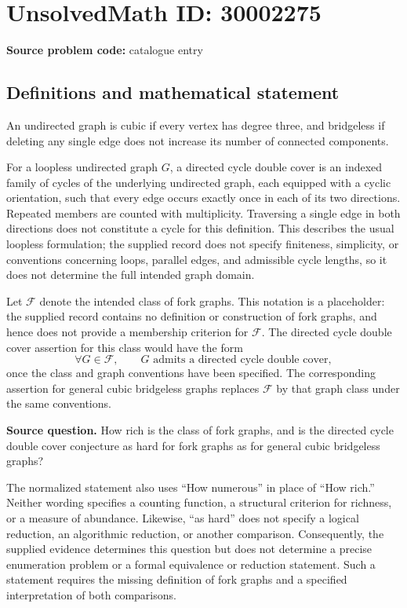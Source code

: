 \documentclass[11pt]{article}
\begin{document}
\section*{UnsolvedMath ID: 30002275}
\textbf{Source problem code:} catalogue entry
\subsection{Definitions and mathematical statement}
An undirected graph is cubic if every vertex has degree three, and bridgeless if deleting any single edge does not increase its number of connected components.

For a loopless undirected graph \(G\), a directed cycle double cover is an indexed family of cycles of the underlying undirected graph, each equipped with a cyclic orientation, such that every edge occurs exactly once in each of its two directions. Repeated members are counted with multiplicity. Traversing a single edge in both directions does not constitute a cycle for this definition. This describes the usual loopless formulation; the supplied record does not specify finiteness, simplicity, or conventions concerning loops, parallel edges, and admissible cycle lengths, so it does not determine the full intended graph domain.

Let \(\mathcal F\) denote the intended class of fork graphs. This notation is a placeholder: the supplied record contains no definition or construction of fork graphs, and hence does not provide a membership criterion for \(\mathcal F\). The directed cycle double cover assertion for this class would have the form
\[
\forall G\in\mathcal F,\qquad G\text{ admits a directed cycle double cover},
\]
once the class and graph conventions have been specified. The corresponding assertion for general cubic bridgeless graphs replaces \(\mathcal F\) by that graph class under the same conventions.

\textbf{Source question.} How rich is the class of fork graphs, and is the directed cycle double cover conjecture as hard for fork graphs as for general cubic bridgeless graphs?

The normalized statement also uses ``How numerous'' in place of ``How rich.'' Neither wording specifies a counting function, a structural criterion for richness, or a measure of abundance. Likewise, ``as hard'' does not specify a logical reduction, an algorithmic reduction, or another comparison. Consequently, the supplied evidence determines this question but does not determine a precise enumeration problem or a formal equivalence or reduction statement. Such a statement requires the missing definition of fork graphs and a specified interpretation of both comparisons.
\end{document}
